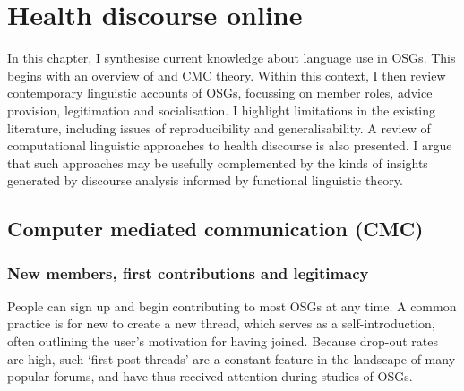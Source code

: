 
\chapter{Health discourse online} \label{chap:onlinehealth}

In this chapter, I synthesise current knowledge about language use in \glspl{OSG}. This begins with an overview of  and \gls{CMC} theory. Within this context, I then review contemporary linguistic accounts of \glspl{OSG}, focussing on member roles, advice provision, legitimation and socialisation. I highlight limitations in the existing literature, including issues of reproducibility and generalisability. A review of computational linguistic approaches to health discourse is also presented. I argue that such approaches may be usefully complemented by the kinds of insights generated by discourse analysis informed by functional linguistic theory. 

\section{Computer mediated communication (CMC)}


%







\subsection{New members, first contributions and legitimacy} \label{sect:newmembers}

People can sign up and begin contributing to most \glspl{OSG} at any time. A common practice is for new  to create a new \gls{thread}, which serves as a self\hyp{}introduction, often outlining the user's motivation for having joined. Because drop\hyp{}out rates are high, such `first \gls{post} \glspl{thread}' are a constant feature in the landscape of many popular \glspl{forum}, and have thus received attention during studies of \glspl{OSG}.

